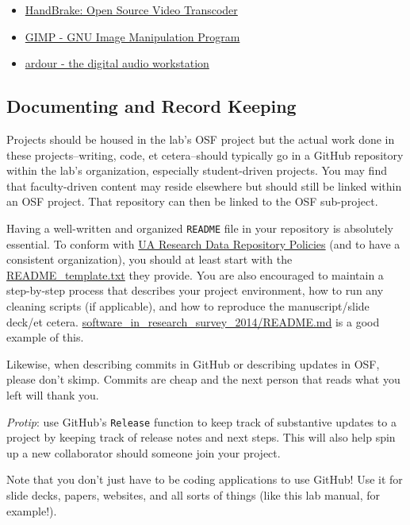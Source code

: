 \documentclass[
]{book}
\providecommand{\tightlist}{%
  \setlength{\itemsep}{0pt}\setlength{\parskip}{0pt}}
\begin{document}
\begin{itemize}
\tightlist
\item
  \href{https://handbrake.fr/}{HandBrake: Open Source Video Transcoder}
\item
  \href{https://www.gimp.org/}{GIMP - GNU Image Manipulation Program}
\item
  \href{https://ardour.org/}{ardour - the digital audio workstation}
\end{itemize}

\hypertarget{documenting}{%
\subsection{Documenting and Record Keeping}\label{documenting}}

Projects should be housed in the lab's OSF project but the actual work done in these projects--writing, code, et cetera--should typically go in a GitHub repository within the lab's organization, especially student-driven projects. You may find that faculty-driven content may reside elsewhere but should still be linked within an OSF project. That repository can then be linked to the OSF sub-project.

Having a well-written and organized \texttt{README} file in your repository is absolutely essential. To conform with \href{https://data.library.arizona.edu/data-management/best-practices/data-documentation-readme-metadata}{UA Research Data Repository Policies} (and to have a consistent organization), you should at least start with the \href{https://osf.io/sj8xv/}{README\_template.txt} they provide. You are also encouraged to maintain a step-by-step process that describes your project environment, how to run any cleaning scripts (if applicable), and how to reproduce the manuscript/slide deck/et cetera. \href{https://github.com/softwaresaved/software_in_research_survey_2014/blob/1.0/README.md}{software\_in\_research\_survey\_2014/README.md} is a good example of this.

Likewise, when describing commits in GitHub or describing updates in OSF, please don't skimp. Commits are cheap and the next person that reads what you left will thank you.

\emph{Protip}: use GitHub's \texttt{Release} function to keep track of substantive updates to a project by keeping track of release notes and next steps. This will also help spin up a new collaborator should someone join your project.

Note that you don't just have to be coding applications to use GitHub! Use it for slide decks, papers, websites, and all sorts of things (like this lab manual, for example!).
\end{document}
